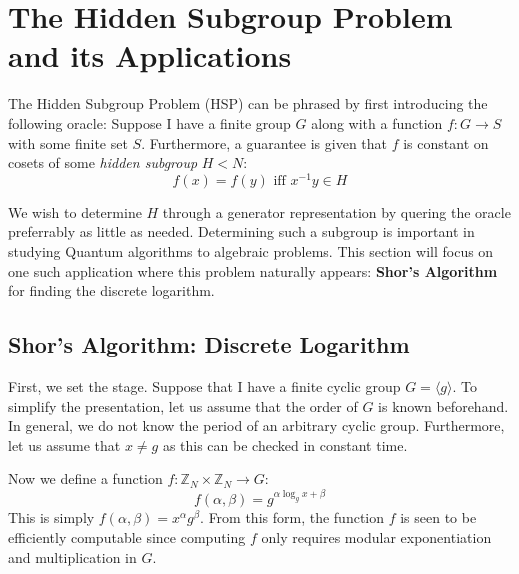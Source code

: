\documentclass{../quantum.tex}
\begin{document}
\section{The Hidden Subgroup Problem and its Applications}

The Hidden Subgroup Problem (HSP) can be phrased by first introducing the following oracle:
%
Suppose I have a finite group $G$ along with a function $f: G \rightarrow S$ with some finite set $S$. Furthermore, a guarantee is given that $f$ is constant on cosets of some
\textit{hidden subgroup} $H < N$:
%
$$ f(x) = f(y) \text{ iff } x^{-1}y \in H $$

We wish to determine $H$ through a generator representation by quering the oracle preferrably as little as needed. Determining such a subgroup is important in studying Quantum algorithms to algebraic problems. This section will focus on one such application where this problem naturally appears: {\bf Shor's Algorithm} for finding the discrete logarithm.
%

\subsection{Shor's Algorithm: Discrete Logarithm}
First, we set the stage. Suppose that I have a finite cyclic group $G = \langle g \rangle$. To simplify the presentation, let us assume that the order of $G$ is known beforehand. In general, we do not know the period of an arbitrary cyclic group. Furthermore, let us assume that $x \neq g$ as this can be checked in constant time.
%

Now we define a function $f: \mathbb{Z}_N \times \mathbb{Z}_N \rightarrow G$:
\begin{equation}
  f(\alpha,\beta) = g^{\alpha\log_g{x} + \beta}
\end{equation}
This is simply $f(\alpha,\beta) = x^{\alpha}g^{\beta}$. From this form, the function $f$ is seen to be efficiently computable since computing $f$ only requires modular exponentiation and multiplication in $G$.
\end{document}
